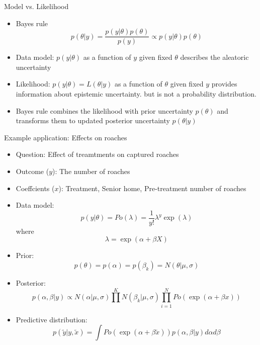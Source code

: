 \documentclass[10pt]{beamer}
\begin{document}
\begin{frame}{Model vs. Likelihood}
  \begin{itemize}
  \item Bayes rule
      \[
      p(\theta|y) = \frac{p(y|\theta)p(\theta)}{p(y)} \propto p(y|\theta)p(\theta)
      \]
    \vspace{\baselineskip}
  \item Data model: $p(y|\theta)$ as a function of $y$ given fixed $\theta$
    describes the {\color{uured} aleatoric} uncertainty \vspace{\baselineskip}
  \item Likelihood: $p(y|\theta)=L(\theta|y)$
    as a function of $\theta$
    given fixed $y$ provides information about epistemic uncertainty.%
    but is not a probability distribution. %
    \vspace{\baselineskip}
  \item<2-> Bayes rule combines the likelihood with prior uncertainty
    $p(\theta)$ and transforms them to updated posterior uncertainty $p(\theta|y)$
  \end{itemize}
\end{frame}



\begin{frame}{Example application: Effects on roaches}
\begin{itemize}
\item Question: Effect of treamtments on captured roaches
\pause
\item Outcome ($y$): The number of roaches
\item Coeffcients ($x$): Treatment, Senior home, Pre-treatment number of roaches
\pause
\item Data model:
\[
p(y|\theta) = Po(\lambda) = \frac{1}{y!}\lambda^y \exp(\lambda)
\]
where
\[
\lambda = \exp(\alpha + \beta X)
\]
\item Prior:
\[
p(\theta) = p(\alpha) = p(\beta_k) = N(\theta|\mu,\sigma)
\]
\pause
\item Posterior:
\[
p(\alpha, \beta|y) \propto N(\alpha|\mu,\sigma) \prod^K N(\beta_k|\mu,\sigma) \prod^N_{i=1} Po(\exp(\alpha + \beta x))
\]
\pause
\item Predictive distribution:
\[
p(\tilde{y}|y,\tilde{x}) = \int Po(\exp(\alpha + \beta \tilde{x})) p(\alpha, \beta |y) d\alpha d\beta
\]

\end{itemize}

\end{frame}
\end{document}
